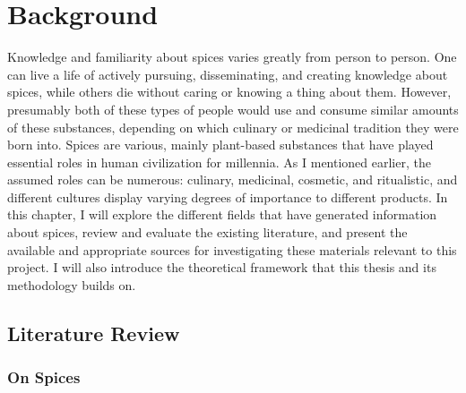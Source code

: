 \chapter{Background}
\label{ch:background}


Knowledge and familiarity about spices varies greatly from person to person. One can live a life of actively pursuing, disseminating, and creating knowledge about spices, while others die without caring or knowing a thing about them. However, presumably both of these types of people would use and consume similar amounts of these substances, depending on which culinary or medicinal tradition they were born into. Spices are various, mainly plant-based substances that have played essential roles in human civilization for millennia. As I mentioned earlier, the assumed roles can be numerous: culinary, medicinal, cosmetic, and ritualistic, and different cultures display varying degrees of importance to different products. 
In this chapter, I will explore the different fields that have generated information about spices, review and evaluate the existing literature, and present the available and appropriate sources for investigating these materials relevant to this project. I will also introduce the theoretical framework that this thesis and its methodology builds on.

\section{Literature Review}

\subsection{On Spices}

